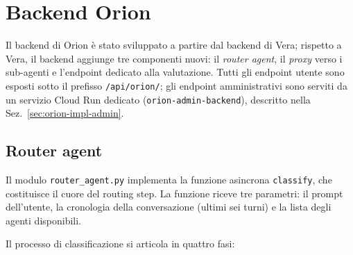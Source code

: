 \section{Backend Orion}
\label{sec:orion-impl-backend}

Il backend di Orion è stato sviluppato a partire dal backend di Vera;
rispetto a Vera, il backend aggiunge tre componenti nuovi: il \emph{router agent},
il \emph{proxy} verso i sub-agenti e l'endpoint dedicato alla valutazione.
Tutti gli endpoint utente sono esposti sotto il prefisso \texttt{/api/orion/};
gli endpoint amministrativi sono serviti da un servizio Cloud Run dedicato (\texttt{orion-admin-backend}),
descritto nella Sez.~\ref{sec:orion-impl-admin}.

\subsection{Router agent}
\label{subsec:orion-impl-router}

Il modulo \texttt{router\_agent.py} implementa la funzione asincrona \texttt{classify}, 
che costituisce il cuore del routing step. La funzione riceve tre parametri: il prompt dell'utente, la cronologia della conversazione (ultimi sei turni) 
e la lista degli agenti disponibili.

Il processo di classificazione si articola in quattro fasi:

